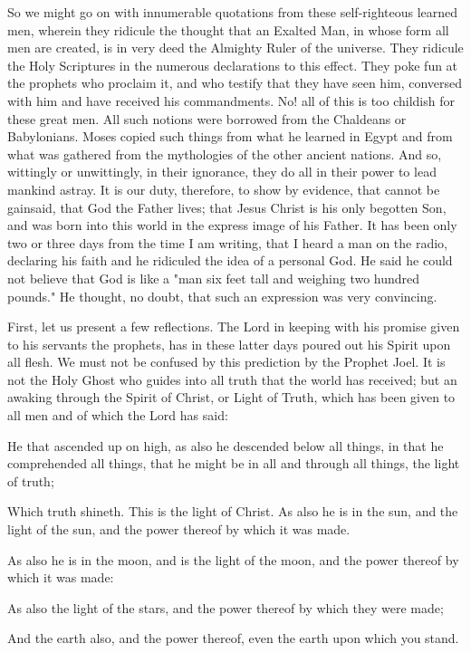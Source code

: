 So we might go on with innumerable quotations from these self-righteous learned men,
wherein they ridicule the thought that an Exalted Man, in whose form all men are created, is
in very deed the Almighty Ruler of the universe. They ridicule the Holy Scriptures in the
numerous declarations to this effect. They poke fun at the prophets who proclaim it, and who
testify that they have seen him, conversed with him and have received his commandments.
No! all of this is too childish for these great men. All such notions were borrowed from the
Chaldeans or Babylonians. Moses copied such things from what he learned in Egypt and
from what was gathered from the mythologies of the other ancient nations. And so, wittingly
or unwittingly, in their ignorance, they do all in their power to lead mankind astray. It is our
duty, therefore, to show by evidence, that cannot be gainsaid, that God the Father lives; that
Jesus Christ is his only begotten Son, and was born into this world in the express image of
his Father. It has been only two or three days from the time I am writing, that I heard a man
on the radio, declaring his faith and he ridiculed the idea of a personal God. He said he could
not believe that God is like a "man six feet tall and weighing two hundred pounds." He
thought, no doubt, that such an expression was very convincing.

First, let us present a few reflections. The Lord in keeping with his promise given to his
servants the prophets, has in these latter days poured out his Spirit upon all flesh. We must
not be confused by this prediction by the Prophet Joel. It is not the Holy Ghost who guides
into all truth that the world has received; but an awaking through the Spirit of Christ, or Light
of Truth, which has been given to all men and of which the Lord has said:

He that ascended up on high, as also he descended below all things, in that he comprehended
all things, that he might be in all and through all things, the light of truth;

Which truth shineth. This is the light of Christ. As also he is in the sun, and the light of the
sun, and the power thereof by which it was made.

As also he is in the moon, and is the light of the moon, and the power thereof by which it was
made:

As also the light of the stars, and the power thereof by which they were made;

And the earth also, and the power thereof, even the earth upon which you stand.

